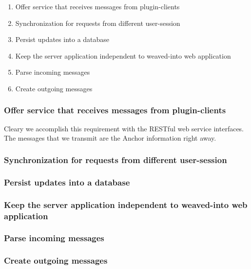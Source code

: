 \begin{enumerate}
	\item Offer service that receives messages from plugin-clients
	\item Synchronization for requests from different user-session
	\item Persist updates into a database
	\item Keep the server application independent to weaved-into web application
	\item Parse incoming messages
	\item Create outgoing messages
\end{enumerate}

\subsubsection{Offer service that receives messages from plugin-clients}
Cleary we accomplish this requirement with the RESTful web service interfaces. The messages that we transmit are the Anchor information right away. 


\subsubsection{Synchronization for requests from different user-session}

\subsubsection{Persist updates into a database}

\subsubsection{Keep the server application independent to weaved-into web application}

\subsubsection{Parse incoming messages}

\subsubsection{Create outgoing messages}
